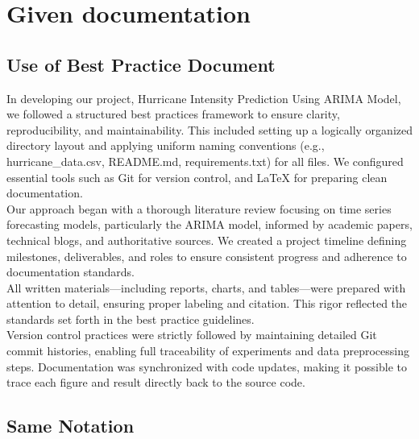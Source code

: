 %
%
%
\chapter{Given documentation}

\section{Use of Best Practice Document}
In developing our project, Hurricane Intensity Prediction Using ARIMA Model, we followed a structured best practices framework to ensure clarity, reproducibility, and maintainability. This included setting up a logically organized directory layout and applying uniform naming conventions (e.g., hurricane\_data.csv, README.md, requirements.txt) for all files. We configured essential tools such as Git for version control, and LaTeX for preparing clean documentation.\\
Our approach began with a thorough literature review focusing on time series forecasting models, particularly the ARIMA model, informed by academic papers, technical blogs, and authoritative sources. We created a project timeline defining milestones, deliverables, and roles to ensure consistent progress and adherence to documentation standards.\\
All written materials—including reports, charts, and tables—were prepared with attention to detail, ensuring proper labeling and citation. This rigor reflected the standards set forth in the best practice guidelines.\\
Version control practices were strictly followed by maintaining detailed Git commit histories, enabling full traceability of experiments and data preprocessing steps. Documentation was synchronized with code updates, making it possible to trace each figure and result directly back to the source code.

\section{Same Notation}




